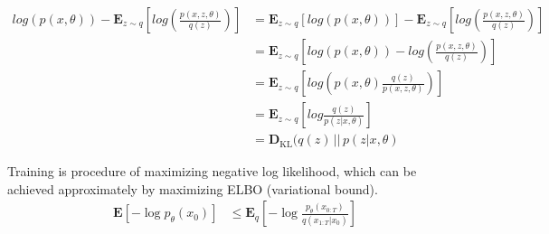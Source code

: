 \documentclass[11pt, oneside]{article}   	%
\begin{document}
\begin{align*}
	log\left(p(x, \theta)\right) - \mathbf{E}_{z \sim q}\left[log\left(\frac{p(x, z, \theta)}{q(z)}\right)\right]
	&= \mathbf{E}_{z \sim q}\left[log\left(p(x, \theta)\right)\right] - \mathbf{E}_{z \sim q}\left[log\left(\frac{p(x, z, \theta)}{q(z)}\right)\right] \\
	&= \mathbf{E}_{z \sim q}\left[log\left(p(x, \theta)\right) - log\left(\frac{p(x, z, \theta)}{q(z)}\right)\right] \\
	&= \mathbf{E}_{z \sim q}\left[log\left(p(x, \theta)\frac{q(z)}{p(x, z, \theta)}\right)\right] \\
	&= \mathbf{E}_{z \sim q}\left[log \frac{q(z)}{p(z|x, \theta)}\right] \\
	&= \mathbf{D}_{\mathrm{KL}}(q(z)\,||\,p(z|x, \theta)
\end{align*}

\vspace{1cm}




Training is procedure of maximizing negative log likelihood, which can be achieved approximately by maximizing ELBO (variational bound).
\begin{align*}
	\mathbf{E}[-\log{p_{\theta}(x_{0})}]
	&\leq\mathbf{E}_{q}\left[-\log{\frac{p_{\theta}(x_{0:T})}{q(x_{1:T}|x_{0})}}\right]
\end{align*}
\end{document}
